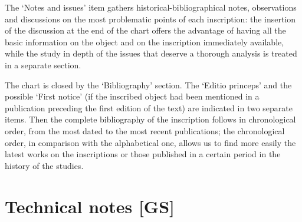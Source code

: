 \documentclass[amsthm,ebook]{saparticle}
\begin{document}
The ‘Notes and issues' item gathers historical-bibliographical notes, observations and discussions on the most
problematic points of each inscription: the insertion of the discussion at the end of the chart offers the advantage of
having all the basic information on the object and on the inscription immediately available, while the study in depth
of the issues that deserve a thorough analysis is treated in a separate section. 

The chart is closed by the ‘Bibliography' section. The ‘Editio princeps' and the possible ‘First notice' (if the
inscribed object had been mentioned in a publication preceding the first edition of the text) are indicated in two
separate items. Then the complete bibliography of the inscription follows in chronological order, from the most dated
to the most recent publications; the chronological order, in comparison with the alphabetical one, allows us to find
more easily the latest works on the inscriptions or those published in a certain period in the history of the studies. 

\section{Technical notes [GS]}\label{sec:4tech}
\end{document}
